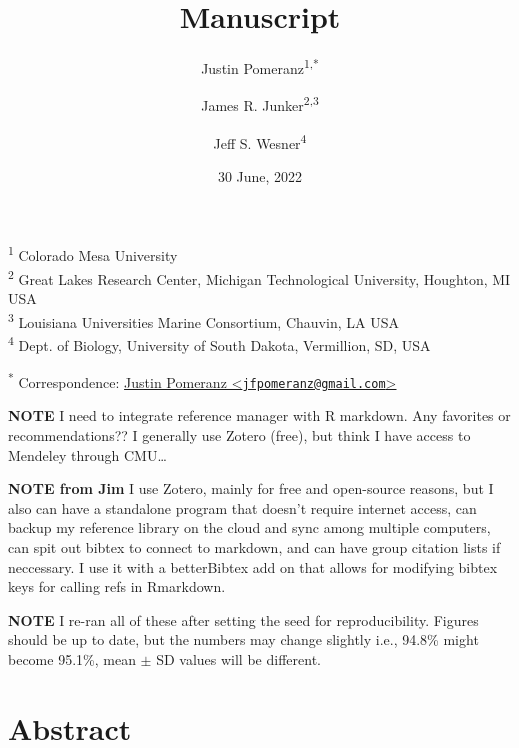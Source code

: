 \documentclass[
]{article}
\title{Manuscript}
\author{Justin Pomeranz\textsuperscript{1,*} \and James R.
Junker\textsuperscript{2,3} \and Jeff S. Wesner\textsuperscript{4}}
\date{30 June, 2022}
\begin{document}
\maketitle

{
\setcounter{tocdepth}{2}
\tableofcontents
}
\textsuperscript{1} Colorado Mesa University\\
\textsuperscript{2} Great Lakes Research Center, Michigan Technological
University, Houghton, MI USA\\
\textsuperscript{3} Louisiana Universities Marine Consortium, Chauvin,
LA USA\\
\textsuperscript{4} Dept. of Biology, University of South Dakota,
Vermillion, SD, USA

\textsuperscript{*} Correspondence:
\href{mailto:jfpomeranz@gmail.com}{Justin Pomeranz
\textless{}\href{mailto:jfpomeranz@gmail.com}{\nolinkurl{jfpomeranz@gmail.com}}\textgreater{}}

\textbf{NOTE} I need to integrate reference manager with R markdown. Any
favorites or recommendations?? I generally use Zotero (free), but think
I have access to Mendeley through CMU\ldots{}

\textbf{NOTE from Jim} I use Zotero, mainly for free and open-source
reasons, but I also can have a standalone program that doesn't require
internet access, can backup my reference library on the cloud and sync
among multiple computers, can spit out bibtex to connect to markdown,
and can have group citation lists if neccessary. I use it with a
betterBibtex add on that allows for modifying bibtex keys for calling
refs in Rmarkdown.

\textbf{NOTE} I re-ran all of these after setting the seed for
reproducibility. Figures should be up to date, but the numbers may
change slightly i.e., 94.8\% might become 95.1\%, mean \(\pm\) SD values
will be different.

\hypertarget{abstract}{%
\section{Abstract}\label{abstract}}
\end{document}
